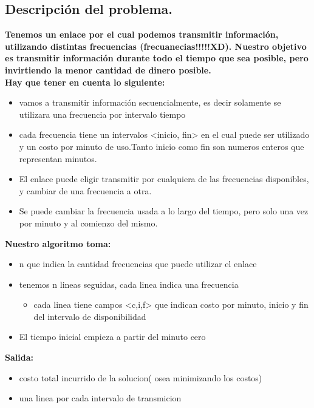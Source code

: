 \subsection{Descripción del problema.}

\vspace*{0.3cm}

\textbf{
Tenemos un enlace por el cual podemos transmitir información, utilizando distintas frecuencias (frecuanecias!!!!!XD).
Nuestro objetivo es transmitir información durante todo el tiempo que sea posible, pero invirtiendo la menor cantidad de dinero posible.
\\
Hay que tener en cuenta lo siguiente:
}
\begin{itemize}
	\item vamos a transmitir información secuencialmente, es decir solamente se utilizara una frecuencia por intervalo tiempo 
	\item cada frecuencia tiene un intervalos <inicio, fin> en el cual puede ser utilizado y un costo por minuto de uso.Tanto inicio como fin son numeros enteros que representan minutos. 
	\item El enlace puede eligir transmitir por cualquiera de las frecuencias disponibles, y cambiar de una frecuencia a otra.
	\item Se puede cambiar la frecuencia usada a lo largo del tiempo, pero solo una vez por minuto y al comienzo del mismo.
\end{itemize}

\textbf{Nuestro algoritmo toma:}
\begin{itemize}
	\item n que indica la cantidad frecuencias que puede utilizar el enlace
	\item tenemos n lineas seguidas, cada linea indica una frecuencia
	\begin{itemize}
		\item cada linea tiene campos <c,i,f> que indican costo por minuto, inicio y fin del intervalo de disponibilidad
	\end{itemize}
	\item El tiempo inicial empieza a partir del minuto cero
\end{itemize}

\textbf{Salida:}
\begin{itemize}
	  \item costo total incurrido de la solucion( osea minimizando los costos)
	  \item una linea por cada intervalo de transmicion 
\end{itemize}


